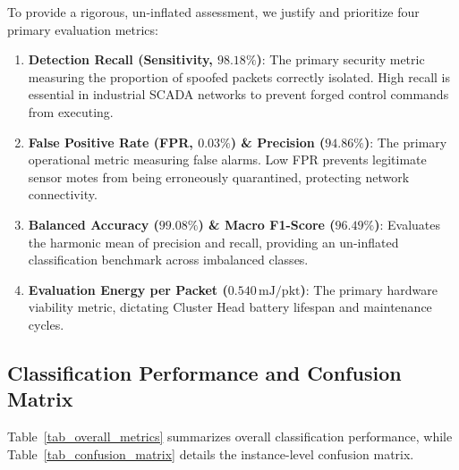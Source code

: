 \documentclass[conference]{IEEEtran}
\begin{document}
To provide a rigorous, un-inflated assessment, we justify and prioritize four primary evaluation metrics:
\begin{enumerate}
    \item \textbf{Detection Recall (Sensitivity, $98.18\%$)}: The primary security metric measuring the proportion of spoofed packets correctly isolated. High recall is essential in industrial SCADA networks to prevent forged control commands from executing.
    \item \textbf{False Positive Rate (FPR, $0.03\%$) \& Precision ($94.86\%$)}: The primary operational metric measuring false alarms. Low FPR prevents legitimate sensor motes from being erroneously quarantined, protecting network connectivity.
    \item \textbf{Balanced Accuracy ($99.08\%$) \& Macro F1-Score ($96.49\%$)}: Evaluates the harmonic mean of precision and recall, providing an un-inflated classification benchmark across imbalanced classes.
    \item \textbf{Evaluation Energy per Packet ($0.540\,\text{mJ/pkt}$)}: The primary hardware viability metric, dictating Cluster Head battery lifespan and maintenance cycles.
\end{enumerate}

\subsection{Classification Performance and Confusion Matrix}
Table~\ref{tab_overall_metrics} summarizes overall classification performance, while Table~\ref{tab_confusion_matrix} details the instance-level confusion matrix.

\begin{table}[htbp]
\caption{Overall System Performance Classification Metrics}
\label{tab_overall_metrics}
\centering
\small
\renewcommand{\arraystretch}{1.15}
\end{table}
\end{document}
